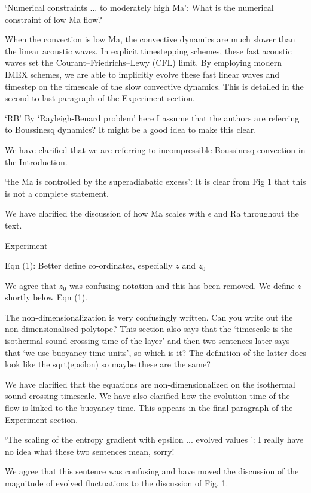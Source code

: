 \documentclass[aps, 11pt, singlecolumn]{revtex4-1} %
\begin{document}
\begin{singlespace}
\begin{myquotation}
`Numerical constraints ... to moderately high Ma': What is the
numerical constraint of low Ma flow?
\end{myquotation}
When the convection is low Ma, the convective dynamics are much slower
than the linear acoustic waves.  In explicit timestepping schemes, these
fast acoustic waves set the Courant–Friedrichs–Lewy (CFL) limit.
By employing modern IMEX schemes, we are able to implicitly evolve these
fast linear waves and timestep on the timescale of the slow convective
dynamics.    This is detailed in the second to
last paragraph of the Experiment section.

\begin{myquotation}
`RB' By `Rayleigh-Benard problem' here I assume that the
authors are referring to Boussinesq dynamics? It might be a good idea
to make this clear.
\end{myquotation}
We have clarified that we are referring to incompressible Boussinesq convection
in the Introduction.

\begin{myquotation}
`the Ma is controlled by the superadiabatic excess': It is clear
from Fig 1 that this is not a complete statement.
\end{myquotation}
We have clarified the discussion of how Ma scales with $\epsilon$ and
Ra throughout the text.

\begin{myquotation}
Experiment

Eqn (1): Better define co-ordinates, especially $z$ and $z_0$
\end{myquotation}
We agree that $z_0$ was confusing notation and this has been removed.  
We define $z$ shortly below Eqn (1).

\begin{myquotation}
The non-dimensionalization is very confusingly written. Can you write
out the non-dimensionalised polytope? This section also says that the
`timescale is the isothermal sound crossing time of the layer'
and then two sentences later says that `we use buoyancy time
units', so which is it? The definition of the latter does look like
the sqrt(epsilon) so maybe these are the same?
\end{myquotation}
We have clarified that the equations are non-dimensionalized on
the isothermal sound crossing timescale.  We have also clarified
how the evolution time of the flow is linked to the buoyancy time.
This appears in the final paragraph of the Experiment section.

\begin{myquotation}
`The scaling of the entropy gradient with epsilon ... evolved
values ': I really have no idea what these two sentences mean,
sorry!
\end{myquotation}
We agree that this sentence was confusing and have moved the
discussion of the magnitude of evolved fluctuations to the
discussion of Fig. 1.


\end{singlespace}
\end{document}
